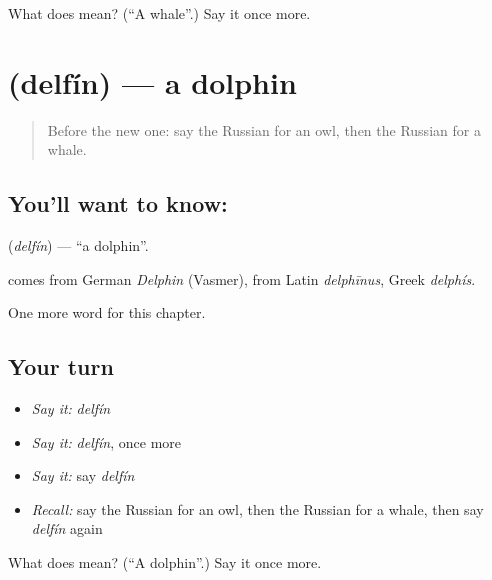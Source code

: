 \begin{tcolorbox}[breakable,colback=teal!4,colframe=teal!35!black,title={Before you move on}]
What does  mean? (\textquotedblleft{}A whale\textquotedblright{}.) Say it once more.
\end{tcolorbox}
\section[\texorpdfstring{\ru{дельфин} (delfín)}{дельфин (delfín)}]{ (delfín) — a dolphin}

\label{lesson:RU-C118-dolphin}



\begin{quote}
Before the new one: say the Russian for an owl, then the Russian for a whale.
\end{quote}

\subsection*{You'll want to know: }
\textbf{} (\emph{delfín}) — \textquotedblleft{}a dolphin\textquotedblright{}.

\begin{cousinweb}
\textbf{} comes from German \emph{Delphin} (Vasmer), from Latin \emph{delphīnus}, Greek \emph{delphís}.
\end{cousinweb}

\begin{grammarlens}[title={What you've built}]
One more word for this chapter.
\end{grammarlens}

\subsection*{Your turn}
\begin{itemize}
\raggedright
  \item \emph{Say it:} \emph{delfín}
  \item \emph{Say it:} \emph{delfín}, once more
  \item \emph{Say it:} say \emph{delfín}
  \item \emph{Recall:} say the Russian for an owl, then the Russian for a whale, then say \emph{delfín} again
\end{itemize}

\begin{tcolorbox}[breakable,colback=teal!4,colframe=teal!35!black,title={Before you move on}]
What does  mean? (\textquotedblleft{}A dolphin\textquotedblright{}.) Say it once more.
\end{tcolorbox}
